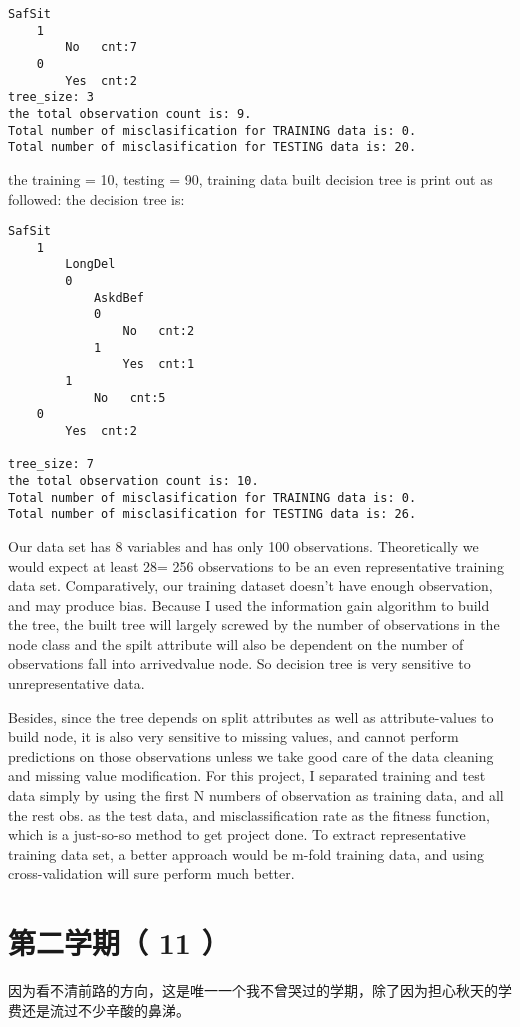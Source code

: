 \documentclass[12pt]{book}
\begin{document}
\lstset{language=java,label= ,caption= ,numbers=none}
\begin{lstlisting}
SafSit
	1
		No	 cnt:7
	0
		Yes	 cnt:2
tree_size: 3
the total observation count is: 9.
Total number of misclasification for TRAINING data is: 0.
Total number of misclasification for TESTING data is: 20.
\end{lstlisting}

the training = 10, testing = 90, training data built decision tree is print out as followed: 
the decision tree is: 
\lstset{language=java,label= ,caption= ,numbers=none}
\begin{lstlisting}
SafSit
	1
		LongDel
		0
			AskdBef
			0
				No	 cnt:2
			1
				Yes	 cnt:1
		1
			No	 cnt:5
	0
		Yes	 cnt:2

tree_size: 7
the total observation count is: 10.
Total number of misclasification for TRAINING data is: 0.
Total number of misclasification for TESTING data is: 26.
\end{lstlisting}

Our data set has 8 variables and has only 100 observations. Theoretically we would expect at least 28= 256 observations to be an even representative training data set. Comparatively, our training dataset doesn’t have enough observation, and may produce bias. 
Because I used the information gain algorithm to build the tree, the built tree will largely screwed by the number of observations in the node class and the spilt attribute will also be dependent on the number of observations fall into arrived\textunderscore value node. So decision tree is very sensitive to unrepresentative data. 

Besides, since the tree depends on split attributes as well as attribute-values to build node, it is also very sensitive to missing values, and cannot perform predictions on those observations unless we take good care of the data cleaning and missing value modification. 
For this project, I separated training and test data simply by using the first N numbers of observation as training data, and all the rest obs. as the test data, and misclassification rate as the fitness function, which is a just-so-so method to get project done. To extract representative training data set, a better approach would be m-fold training data, and using cross-validation will sure perform much better. 

\section{第二学期（ 11 ）}
\label{sec-4-11}
因为看不清前路的方向，这是唯一一个我不曾哭过的学期，除了因为担心秋天的学费还是流过不少辛酸的鼻涕。
\end{document}
